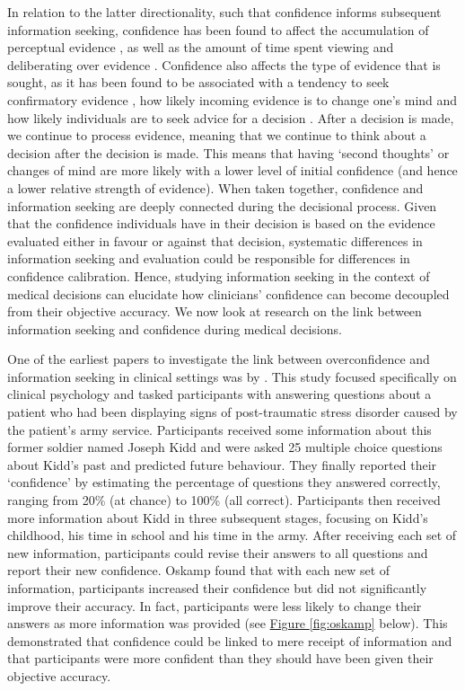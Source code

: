\documentclass[a4paper, nobind]{templates/ociamthesis}
\begin{document}
\hfill\break
In relation to the latter directionality, such that confidence informs subsequent information seeking, confidence has been found to affect the accumulation of perceptual evidence \textcite{balsdon_confidence_2020}, as well as the amount of time spent viewing \autocite{rausch_cognitive_2020} and deliberating over evidence \autocite{kiani_choice_2014}. Confidence also affects the type of evidence that is sought, as it has been found to be associated with a tendency to seek confirmatory evidence \autocite{rollwage_confidence_2020}, how likely incoming evidence is to change one's mind \autocite{pescetelli_confidence_2021} and how likely individuals are to seek advice for a decision \autocite{carlebach2023}. After a decision is made, we continue to process evidence, meaning that we continue to think about a decision after the decision is made. This means that having `second thoughts' or changes of mind are more likely with a lower level of initial confidence (and hence a lower relative strength of evidence). When taken together, confidence and information seeking are deeply connected during the decisional process. Given that the confidence individuals have in their decision is based on the evidence evaluated either in favour or against that decision, systematic differences in information seeking and evaluation could be responsible for differences in confidence calibration. Hence, studying information seeking in the context of medical decisions can elucidate how clinicians' confidence can become decoupled from their objective accuracy. We now look at research on the link between information seeking and confidence during medical decisions.

\hfill\break
One of the earliest papers to investigate the link between overconfidence and information seeking in clinical settings was by \textcite{oskamp_overconfidence_1965}. This study focused specifically on clinical psychology and tasked participants with answering questions about a patient who had been displaying signs of post-traumatic stress disorder caused by the patient's army service. Participants received some information about this former soldier named Joseph Kidd and were asked 25 multiple choice questions about Kidd's past and predicted future behaviour. They finally reported their `confidence' by estimating the percentage of questions they answered correctly, ranging from 20\% (at chance) to 100\% (all correct). Participants then received more information about Kidd in three subsequent stages, focusing on Kidd's childhood, his time in school and his time in the army. After receiving each set of new information, participants could revise their answers to all questions and report their new confidence. Oskamp found that with each new set of information, participants increased their confidence but did not significantly improve their accuracy. In fact, participants were less likely to change their answers as more information was provided (see \hyperref[fig:oskamp]{Figure \ref{fig:oskamp}} below). This demonstrated that confidence could be linked to mere receipt of information and that participants were more confident than they should have been given their objective accuracy.
\end{document}
